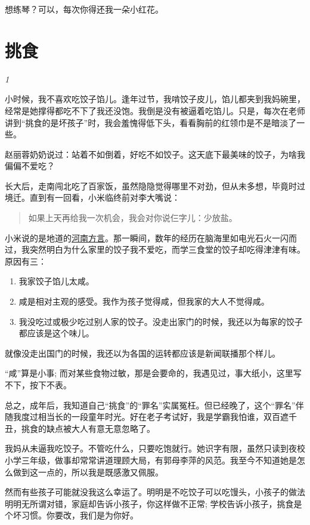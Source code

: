 \documentclass[twoside,openright,headings=optiontohead]{ctexbook} %
\providecommand{\tightlist}{%
   \setlength{\itemsep}{0pt}\setlength{\parskip}{0pt}}
\begin{document}
{想练琴？可以，每次你得还我一朵小红花。

\chapter*{挑食}\label{food-picking2}

\emph{1}

小时候，我不喜欢吃饺子馅儿。逢年过节，我啃饺子皮儿，馅儿都夹到我妈碗里，经常是她撑得都吃不下了我还没饱。我倒是没有被逼着吃馅儿。只是，每次在老师讲到``挑食的是坏孩子''时，我会羞愧得低下头，看看胸前的红领巾是不是暗淡了一些。

赵丽蓉奶奶说过：站着不如倒着，好吃不如饺子。这天底下最美味的饺子，为啥我偏偏不爱吃？

长大后，走南闯北吃了百家饭，虽然隐隐觉得哪里不对劲，但从未多想，毕竟时过境迁。直到有一回看，小米临终前对李大嘴说：

\begin{quote}
如果上天再给我一次机会，我会对你说仨字儿：少放盐。
\end{quote}

小米说的是地道的\href{http://dapengde.com/archives/17510}{河南方言}。那一瞬间，数年的经历在脑海里如电光石火一闪而过，我突然明白为什么家里的饺子我不爱吃，而学三食堂的饺子却吃得津津有味。原因有三：

\begin{enumerate}
\def\labelenumi{\arabic{enumi}.}
\tightlist
\item
  我家饺子馅儿太咸。
\item
  咸是相对主观的感受。我作为孩子觉得咸，但我家的大人不觉得咸。
\item
  我没吃过或极少吃过别人家的饺子。没走出家门的时候，我还以为每家的饺子都应该是这个味儿。
\end{enumerate}

就像没走出国门的时候，我还以为各国的运转都应该是新闻联播那个样儿。

``咸''算是小事;
而对某些食物过敏，那是会要命的，我遇见过，事大纸小，这里写不下，按下不表。

总之，成年后，我知道自己``挑食''的``罪名''实属冤枉。但已经晚了，这个``罪名''伴随我度过相当长的一段童年时光。好在老子考试好，我是学霸我怕谁，双百遮千丑，挑食的缺点被大人有意无意忽略了。

我妈从未逼我吃饺子。不管吃什么，只要吃饱就行。她识字有限，虽然只读到夜校小学三年级，做事却常常讲道理顾大局，有郭母李萍的风范。我至今不知道她是怎么做到这一点的，所以我是既感激又佩服。

然而有些孩子可能就没我这么幸运了。明明是不吃饺子可以吃馒头，小孩子的做法明明无所谓对错，家庭却告诉小孩子，你这样做不正常;
学校告诉小孩子，挑食是个坏习惯。你要改，我们是为你好。

}
\end{document}
